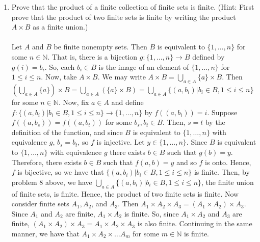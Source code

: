 \documentclass[12pt]{article}
\begin{document}
\begin{enumerate}
\item Prove that the product of a finite collection of finite sets is finite. (Hint: First prove that the product of two finite sets is finite by writing the product $A\times B$ as a finite union.)\\\\
Let $A$ and $B$ be finite nonempty sets. Then $B$ is equivalent to $\{1,\ldots, n\}$ for some $n\in\mathbb{N}$. That is, there is a bijection $g:\{1,\ldots, n\}\rightarrow B$ defined by $g(i)=b_i$. So, each $b_i\in B$ is the image of an element of $\{1,\ldots, n\}$ for $1\leq i\leq n$. Now, take $A\times B$. We may write $A\times B=\bigcup_{a\in A}\{a\}\times B$. Then $(\bigcup_{a\in A}\{a\})\times B=\bigcup_{a\in A}(\{a\}\times B)=\bigcup_{a\in A}\{(a,b_i)|b_i\in B, 1\leq i\leq n\}$ for some $n\in\mathbb{N}$. Now, fix $a\in A$ and define $f:\{(a,b_i)|b_i\in B, 1\leq i\leq n\}\rightarrow\{1,\ldots, n\}$ by $f((a,b_i))=i$. Suppose $f((a,b_s))=f((a,b_t))$ for some $b_s,b_t\in B$. Then, $s=t$ by the definition of the function, and since $B$ is equivalent to $\{1,\dots, n\}$ with equivalence $g$, $b_s=b_t$, so $f$ is injective. Let $y\in\{1,\ldots, n\}$. Since $B$ is equivalent to $\{1,\ldots, n\}$ with equivalence $g$ there exists $b\in B$ such that $g(b)=y$. Therefore, there exists $b\in B$ such that $f(a,b)=y$ and so $f$ is onto. Hence, $f$ is bijective, so we have that $\{(a,b_i)|b_i\in B, 1\leq i\leq n\}$ is finite. Then, by problem 8 above, we have $\bigcup_{a\in A}\{(a,b_i)|b_i\in B, 1\leq i\leq n\}$, the finite union of finite sets, is finite. Hence, the product of two finite sets is finite. Now consider finite sets $A_1, A_2$, and $A_3$. Then $A_1\times A_2\times A_3=(A_1\times A_2)\times A_3$. Since $A_1$ and $A_2$ are finite, $A_1\times A_2$ is finite. So, since $A_1\times A_2$ and $A_3$ are finite, $(A_1\times A_2)\times A_3=A_1\times A_2\times A_3$ is also finite. Continuing in the same manner, we have that $A_1\times A_2\times\dots A_m$ for some $m\in\mathbb{N}$ is finite.\\[20pt]



\end{enumerate}
\end{document}
